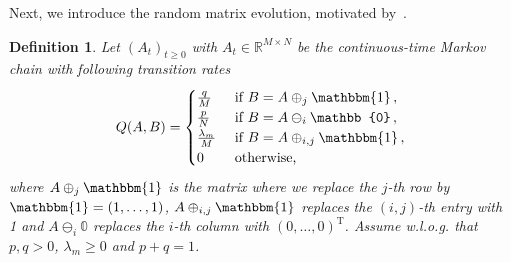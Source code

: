\documentclass{article}
\numberwithin{equation}{section}
\newcommand{\R}     {\mathbb{R}}
\renewcommand{\l}{\lambda}
\newcommand{\1}{\mathbbm{1}}
\newtheorem{definition}[lemma]{Definition}
\begin{document}
Next, we introduce the random matrix evolution, motivated by~\cite{kuehn2025mathematicalmodelsselfadaptiveresponse}. 
\begin{definition}\label{def:mutlCol}
    Let $(A_t)_{t\ge 0}$ with $A_t\in\R^{M\times N}$ be the continuous-time Markov chain with following transition rates
    \begin{equation}\label{eq:transitionRates}
        Q(A,B)=\begin{cases}
            \tfrac{q}{M}&\textnormal{ if }B=A\oplus_j\1\, ,\\
            \tfrac{p}{N}&\textnormal{ if }B=A\ominus_i\mathbb{0}\, ,\\
            \frac{\l_m}{M}&\textnormal{ if }B=A\oplus_{i,j}\1\, ,\\
            0&\textnormal{ otherwise,}
        \end{cases}
    \end{equation}
    where $A\oplus_j\1$ is the matrix where we replace the $j$-th row by $\1=(1,\ldots,1)$, $A\oplus_{i,j}\1$ replaces the $(i,j)$-th entry with 1 and $A\ominus_i\mathbb{0}$ replaces the $i$-th column with $(0,\ldots,0)^\mathrm{T}$. Assume w.l.o.g. that $p,q>0$, $\l_m\ge 0$ and $p+q=1$.
\end{definition}
\end{document}
